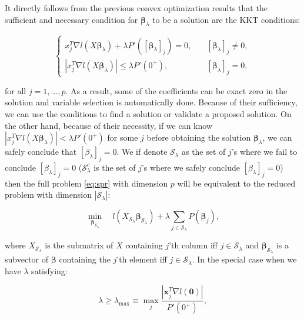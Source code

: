It directly follows from the previous convex optimization results that the sufficient and necessary condition for $\boldsymbol\beta_{\lambda}$ to be a solution are the KKT conditions:

\begin{equation}
    \begin{cases}
        x_j^T\nabla l(X\boldsymbol\beta_\lambda)+\lambda P'([\boldsymbol \beta_\lambda]_j)=0,\quad &[\boldsymbol \beta_\lambda]_j\neq 0,\\
        |x_j^T\nabla l(X\boldsymbol\beta_\lambda)|\leq \lambda P'(0^+),\quad &[\boldsymbol \beta_\lambda]_j= 0,
    \end{cases}
\end{equation}

for all $j=1,...,p$. As a result, some of the coefficients can be exact zero in the solution and variable selection is automatically done. Because of their sufficiency, we can use the conditions to find a solution or validate a proposed solution. On the other hand, because of their necessity, if we can know $|x_j^T\nabla l(X\boldsymbol\beta_\lambda)|< \lambda P'(0^+)$ for some $j$ before obtaining the solution $\boldsymbol\beta_\lambda$, we can safely conclude that $[\beta_\lambda]_j=0$. We if denote $\mathcal{S}_\lambda$ as the set of $j$'s where we fail to conclude $[\beta_\lambda]_j=0$ ($\mathcal{S}_\lambda^c$ is the set of $j$'s where we safely conclude  $[\beta_\lambda]_j=0$) then the full problem \eqref{eq:spr} with dimension $p$ will be equivalent to the reduced problem with dimension $|\mathcal{S}_\lambda|$:

\begin{equation}
    \underset{\boldsymbol\beta_{\mathcal{S}_\lambda}}{\min}\quad l(X_{\mathcal{S}_\lambda}\boldsymbol\beta_{\mathcal{S}_\lambda})+\lambda \sum_{j\in\mathcal{S}_\lambda}P(\boldsymbol\beta_j),
\end{equation}

where $X_{\mathcal{S}_\lambda}$ is the submatrix of $X$ containing $j$'th column iff $j\in\mathcal{S}_\lambda$ and $\boldsymbol\beta_{\mathcal{S}_\lambda}$ is a subvector of $\boldsymbol\beta$ containing the $j$'th element iff $j\in\mathcal{S}_\lambda$. In the special case when we have $\lambda$ satisfying:

\begin{equation}
    \lambda\geq\lambda_{\max}\equiv \underset{j}{\max}\frac{|\boldsymbol x_j^T\nabla l(\boldsymbol0)|}{P'(0^+)},
\end{equation}

